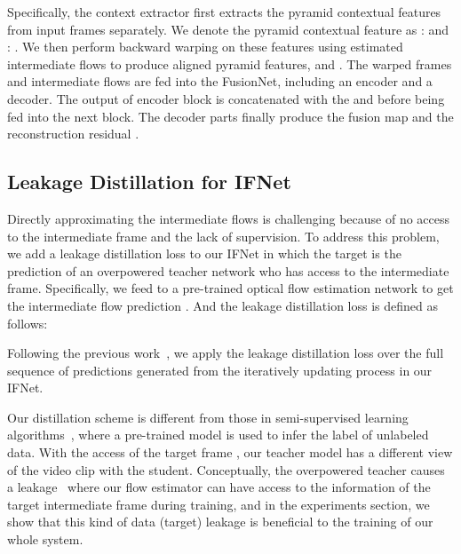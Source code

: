 \documentclass[10pt,twocolumn,letterpaper]{article}
\begin{document}
Specifically, the context extractor first extracts the pyramid contextual features from input frames separately. We denote the pyramid contextual feature as :  and : . We then perform backward warping on these features using estimated intermediate flows to produce aligned pyramid features,  and . The warped frames and intermediate flows are fed into the FusionNet, including an encoder and a decoder. The output of  encoder block is concatenated with the  and  before being fed into the next block. The decoder parts finally produce the fusion map  and the reconstruction residual .






\subsection{Leakage Distillation for IFNet}

\label{subsec:leakage}

Directly approximating the intermediate flows is challenging because of no access to the intermediate frame and the lack of supervision. To address this problem, we add a leakage distillation loss to our IFNet in which the target is the prediction of an overpowered teacher network who has access to the intermediate frame. Specifically, we feed  to a pre-trained optical flow estimation network to get the intermediate flow prediction . And the leakage distillation loss  is defined as follows:

Following the previous work~\cite{teed2020raft}, we apply the leakage distillation loss over the full sequence of predictions generated from the iteratively updating process in our IFNet. 

Our distillation scheme is different from those in semi-supervised learning algorithms~\cite{chen2020big, xie2020self}, where a pre-trained model is used to infer the label of unlabeled data. With the access of the target frame , our teacher model has a different view of the video clip with the student. Conceptually, the overpowered teacher causes a leakage~\cite{kaufman2012leakage} where our flow estimator can have access to the information of the target intermediate frame during training, and in the experiments section, we show that this kind of data (target) leakage is beneficial to the training of our whole system.
\end{document}
